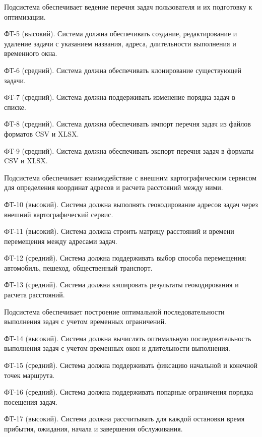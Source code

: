 Подсистема обеспечивает ведение перечня задач пользователя и их подготовку к оптимизации.
\begin{compactlistdot}
  \item ФТ-5 (высокий). Система должна обеспечивать создание, редактирование и удаление задачи с указанием названия, адреса, длительности выполнения и временного окна.
  \item ФТ-6 (средний). Система должна обеспечивать клонирование существующей задачи.
  \item ФТ-7 (средний). Система должна поддерживать изменение порядка задач в списке.
  \item ФТ-8 (средний). Система должна обеспечивать импорт перечня задач из файлов форматов CSV и XLSX.
  \item ФТ-9 (средний). Система должна обеспечивать экспорт перечня задач в форматы CSV и XLSX.
\end{compactlistdot}

Подсистема обеспечивает взаимодействие с внешним картографическим сервисом для
определения координат адресов и расчета расстояний между ними.
\begin{compactlistdot}
  \item ФТ-10 (высокий). Система должна выполнять геокодирование адресов задач через внешний картографический сервис.
  \item ФТ-11 (высокий). Система должна строить матрицу расстояний и времени перемещения между адресами задач.
  \item ФТ-12 (средний). Система должна поддерживать выбор способа перемещения: автомобиль, пешеход, общественный транспорт.
  \item ФТ-13 (средний). Система должна кэшировать результаты геокодирования и расчета расстояний.
\end{compactlistdot}

Подсистема обеспечивает построение оптимальной последовательности выполнения задач с
учетом временных ограничений.
\begin{compactlistdot}
  \item ФТ-14 (высокий). Система должна вычислять оптимальную последовательность выполнения задач с учетом временных окон и длительности выполнения.
  \item ФТ-15 (средний). Система должна поддерживать фиксацию начальной и конечной точек маршрута.
  \item ФТ-16 (средний). Система должна поддерживать попарные ограничения порядка посещения задач.
  \item ФТ-17 (высокий). Система должна рассчитывать для каждой остановки время прибытия, ожидания, начала и завершения обслуживания.
\end{compactlistdot}

